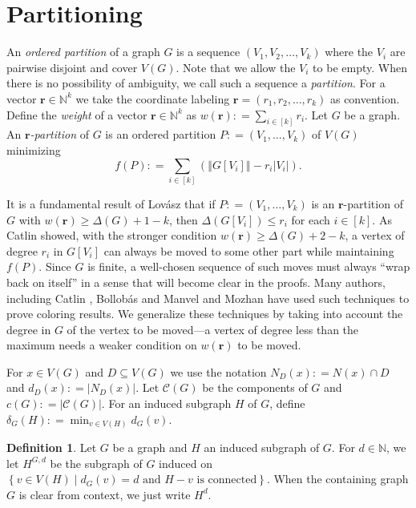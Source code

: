 \documentclass[12pt]{amsart}
\theoremstyle{plain}
\theoremstyle{definition}
\newtheorem{defn}{Definition}
\theoremstyle{remark}
\newcommand{\fancy}[1]{\mathcal{#1}}
\newcommand{\IN}{\mathbb{N}}
\newcommand{\setb}[3]{\left\{ #1 \in #2 \mid #3 \right\}}
\newcommand{\card}[1]{\left|#1\right|}
\newcommand{\size}[1]{\left\Vert#1\right\Vert}
\newcommand{\irange}[1]{\left[#1\right]}
\newcommand{\parens}[1]{\left( #1 \right)}
\newcommand{\DefinedAs}{\mathrel{\mathop:}=}
\newcommand{\mov}[2]{#1^{#2}}
\newcommand{\wt}[1]{w\parens{#1}}
\renewcommand{\vec}[1]{\mathbf{#1}}
\begin{document}
	\section{Partitioning}
	An \emph{ordered partition} of a graph $G$ is a sequence $\parens{V_1, V_2,
	\ldots, V_k}$ where the $V_i$ are pairwise disjoint and cover $V(G)$.  Note that we allow the $V_i$ to be
empty.  When there is no possibility of ambiguity, we call such a sequence a
\emph{partition}.	For a vector $\vec{r} \in \IN^k$ we take the
coordinate labeling $\vec{r} = \parens{r_1, r_2, \ldots, r_k}$ as convention. 
Define the \emph{weight} of a vector $\vec{r} \in \IN^k$ as $\wt{\vec{r}} \DefinedAs \sum_{i \in \irange{k}} r_i$.   
Let $G$ be a graph. An \emph{$\vec{r}$-partition} of $G$ is an ordered partition
$P \DefinedAs \parens{V_1, \ldots, V_k}$ of $V(G)$ minimizing \[f(P) \DefinedAs \sum_{i \in \irange{k}} \parens{\size{G[V_i]} - r_i\card{V_i}}.\]

It is a fundamental result of Lov\'asz \cite{lovasz1966decomposition} that if $P \DefinedAs \parens{V_1, \ldots, V_k}$ is an $\vec{r}$-partition of $G$ with $\wt{\vec{r}} \geq \Delta(G) + 1 - k$, then $\Delta(G[V_i]) \leq r_i$ for each $i \in \irange{k}$.  As Catlin \cite{CatlinAnotherBound} showed, with the stronger condition $\wt{\vec{r}} \geq \Delta(G) + 2 - k$, a vertex of degree $r_i$ in $G[V_i]$ can always be moved to some other part while maintaining $f(P)$.  Since $G$ is finite, a well-chosen sequence of such moves must always ``wrap back on itself'' in a sense that will become clear in the proofs.  Many authors, including Catlin \cite{CatlinAnotherBound}, Bollob\'as and Manvel \cite{bollobasManvel} and Mozhan \cite{mozhan1983} have used such techniques to prove coloring results. We generalize these techniques by taking into account the degree in $G$ of the vertex to be moved---a vertex of degree less than the maximum needs a weaker condition on $\wt{\vec{r}}$ to be moved.

For $x \in V(G)$ and $D \subseteq V(G)$ we use the notation $N_D(x) \DefinedAs N(x) \cap D$ and $d_D(x) \DefinedAs \card{N_D(x)}$. Let $\fancy{C}(G)$ be the components of $G$ and $c(G) \DefinedAs \card{\fancy{C}(G)}$. For an induced subgraph $H$ of $G$, define $\delta_G(H) \DefinedAs \min_{v \in V(H)} d_G(v)$. 
		
		\begin{defn}
			Let $G$ be a graph and $H$ an induced subgraph of $G$.  For $d \in \IN$, we let
			$\mov{H}{G, d}$ be the subgraph of $G$ induced on $\setb{v}{V(H)}{d_G(v) = d \text{ and } H-v
			\text{ is connected}}$.   When the containing graph $G$ is clear from context, we just write $\mov{H}{d}$.  
		\end{defn}
\end{document}
